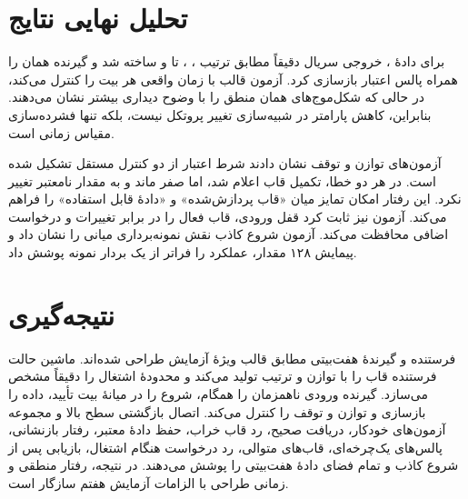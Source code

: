 \section{تحلیل نهایی نتایج}

برای دادهٔ ، خروجی سریال دقیقاً مطابق ترتیب ، ،
 تا  و  ساخته شد و گیرنده همان  را همراه پالس
اعتبار بازسازی کرد. آزمون قالب با  زمان واقعی هر بیت را کنترل می‌کند،
در حالی که شکل‌موج‌های  همان منطق را با وضوح دیداری بیشتر نشان
می‌دهند. بنابراین، کاهش پارامتر در شبیه‌سازی تغییر پروتکل نیست، بلکه تنها فشرده‌سازی مقیاس
زمانی است.

آزمون‌های توازن و توقف نشان دادند شرط اعتبار از دو کنترل مستقل تشکیل شده است. در هر دو
خطا، تکمیل قاب اعلام شد، اما  صفر ماند و  به مقدار
نامعتبر تغییر نکرد. این رفتار امکان تمایز میان «قاب پردازش‌شده» و «دادهٔ قابل استفاده» را
فراهم می‌کند. آزمون  نیز ثابت کرد قفل ورودی، قاب فعال را در برابر تغییرات
 و درخواست اضافی محافظت می‌کند. آزمون شروع کاذب نقش نمونه‌برداری میانی را
نشان داد و پیمایش ۱۲۸ مقدار، عملکرد را فراتر از یک بردار نمونه پوشش داد.


\section{نتیجه‌گیری}

فرستنده و گیرندهٔ  هفت‌بیتی مطابق قالب ویژهٔ آزمایش طراحی شده‌اند. ماشین حالت
فرستنده قاب را با توازن  و ترتیب  تولید می‌کند و 
محدودهٔ اشتغال را دقیقاً مشخص می‌سازد. گیرنده ورودی ناهمزمان را همگام، شروع را در میانهٔ
بیت تأیید، داده را بازسازی و توازن و توقف را کنترل می‌کند. اتصال بازگشتی سطح بالا و مجموعه
آزمون‌های خودکار، دریافت صحیح، رد قاب خراب، حفظ دادهٔ معتبر، رفتار بازنشانی، پالس‌های
یک‌چرخه‌ای، قاب‌های متوالی، رد درخواست هنگام اشتغال، بازیابی پس از شروع کاذب و تمام فضای
دادهٔ هفت‌بیتی را پوشش می‌دهند. در نتیجه، رفتار منطقی و زمانی طراحی با الزامات آزمایش هفتم
سازگار است.
